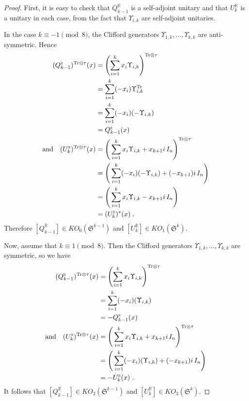 \documentclass[12pt, reqno]{amsart}
\theoremstyle{definition}
\def\R{{\mathbb R}}
\def\T{{\mathbb T}}
\def\Up{{\Upsilon}}
\def\pr{^{\scriptscriptstyle \R}}
\def\T{ ^{\rm{Tr}}}
\def\Ttau{ ^{\rm{Tr} \otimes \tau}}
\newcommand{\fS}{\mathfrak S}
\begin{document}
\begin{proof}
First, it is easy to check that $Q\pr_{k-1}$ is a self-adjoint unitary and that $U\pr_k$ is a unitary in each case, from the fact that
$\Up_{i,k}$ are self-adjoint unitaries.

In the case $k \equiv -1 \pmod 8$, the Clifford generators $\Up_{1, k}, \dots, \Up_{k,k}$ are anti-symmetric. Hence
\begin{align*}
	(Q\pr_{k-1}) \Ttau(x)   
		&= \left( \sum_{i = 1}^k x_i \Up_{i,k} \right) \Ttau \\
		&= \sum_{i = 1}^{k} (-x_i) \Up_{i,k}\T\\
		&= \sum_{i = 1}^{k} (-x_i) ( - \Up_{i,k}) \\
		&= Q\pr_{k-1} (x) \;  \\
\text{and} \quad 
	(U\pr_k)\Ttau(x)   
		&= \left( \,  \sum_{i = 1}^{k} x_i \Up_{i,k}  + x_{k+1} i \, I_n \right) \Ttau \\
		&= \left( \,  \sum_{i = 1}^{k} (-x_i) (-\Up_{i,k})  + (-x_{k+1}) i \, I_n \right)  \\
		&= \left( \,  \sum_{i = 1}^{k} x_i \Up_{i,k} - x_{k+1} i \, I_n \right)  \\
		&= (U\pr_k)^*(x) \; .
\end{align*}
Therefore $[Q\pr_{k-1}] \in KO_0(\fS^{k-1})$ and $[U\pr_{k}] \in KO_1(\fS^{k})$.

Now, assume that $k \equiv 1 \pmod 8$. Then the Clifford generators $\Up_{1, k}, \dots, \Up_{k,k}$ are symmetric, so we have
\begin{align*}
	(Q\pr_{k-1})\Ttau(x)   
		&= \left( \sum_{i = 1}^k x_i \Up_{i,k} \right) \Ttau \\
		&= \sum_{i = 1}^{k} (-x_i) (  \Up_{i,k}) \\
		&= -Q\pr_{k-1} (x) \;  \\
\text{and} \quad 
	(U\pr_k)\Ttau(x)   
		&= \left( \,  \sum_{i = 1}^{k} x_i \Up_{i,k}  + x_{k+1} i \, I_n \right) \Ttau \\
		&= \left( \,  \sum_{i = 1}^{k} (-x_i) (\Up_{i,k})  + (-x_{k+1}) i \, I_n \right)  \\
		&= -U\pr_k(x) \; .
\end{align*}
It follows that $[Q\pr_{k-1}] \in KO_2(\fS^{k-1})$ and $[U\pr_{k}] \in KO_3(\fS^{k})$.


\end{proof}
\end{document}
